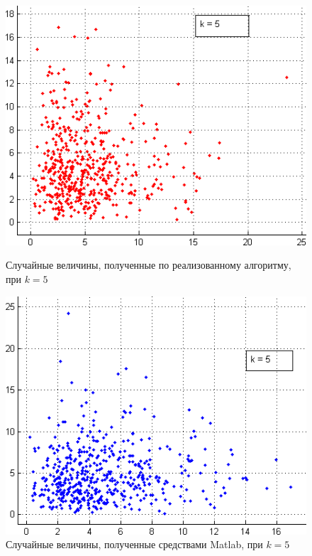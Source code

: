 \begin{figure}[h!]
  \begin{minipage}[h!]{0.47\linewidth}
    \includegraphics[width=1\linewidth]{pic/hi_our_5}
    \caption{Случайные величины, полученные по реализованному алгоритму,
      при $ k = 5 $
  }
  \end{minipage}
  \hfill
  \begin{minipage}[h!]{0.47\linewidth}
    \vspace{4mm}
    \includegraphics[width=1\linewidth]{pic/hi_matlab_5}
    \caption{Случайные величины, полученные средствами Matlab,
      при $ k = 5 $
    }
    \label{pic:hi_end}
  \end{minipage}
\end{figure}

\newpage
